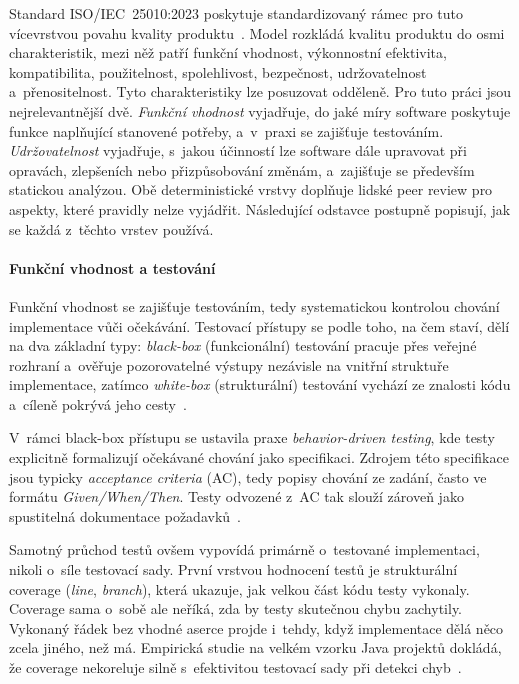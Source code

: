Standard ISO/IEC~25010:2023 poskytuje standardizovaný rámec
pro tuto vícevrstvou povahu kvality produktu~\cite{iso25010}. Model
rozkládá kvalitu produktu do osmi charakteristik, mezi něž patří funkční vhodnost,
výkonnostní efektivita,
kompatibilita, použitelnost, spolehlivost, bezpečnost, udržovatelnost
a~přenositelnost. Tyto charakteristiky lze posuzovat odděleně. Pro tuto
práci jsou nejrelevantnější dvě. \textit{Funkční vhodnost} vyjadřuje, do jaké
míry software poskytuje funkce naplňující stanovené potřeby,
a~v~praxi se zajišťuje testováním. \textit{Udržovatelnost} vyjadřuje,
s~jakou účinností lze software dále upravovat při opravách,
zlepšeních nebo přizpůsobování změnám, a~zajišťuje se především
statickou analýzou. Obě deterministické vrstvy doplňuje lidské peer
review pro aspekty, které pravidly nelze vyjádřit. Následující
odstavce postupně popisují, jak se každá z~těchto vrstev používá.

\paragraph{Funkční vhodnost a testování}
Funkční vhodnost se zajišťuje testováním, tedy systematickou
kontrolou chování implementace vůči očekávání. Testovací přístupy se
podle toho, na čem staví, dělí na dva základní typy: \textit{black-box}
(funkcionální) testování pracuje přes veřejné rozhraní a~ověřuje
pozorovatelné výstupy nezávisle na vnitřní struktuře implementace,
zatímco \textit{white-box} (strukturální) testování vychází ze
znalosti kódu a~cíleně pokrývá jeho cesty~\cite{ammann2016}.

V~rámci black-box přístupu se ustavila praxe \textit{behavior-driven
testing}, kde testy explicitně formalizují očekávané chování jako
specifikaci. Zdrojem této specifikace jsou typicky \textit{acceptance
criteria} (AC), tedy popisy chování ze zadání, často ve formátu
\textit{Given/When/Then}. Testy odvozené z~AC tak slouží zároveň jako
spustitelná dokumentace požadavků~\cite{solis2011}.

Samotný průchod testů ovšem vypovídá primárně o~testované
implementaci, nikoli o~síle testovací sady. První vrstvou hodnocení
testů je strukturální coverage (\textit{line}, \textit{branch}),
která ukazuje, jak velkou část kódu testy vykonaly. Coverage sama
o~sobě ale neříká, zda by testy skutečnou chybu zachytily. Vykonaný
řádek bez vhodné aserce projde i~tehdy, když implementace dělá něco
zcela jiného, než má. Empirická studie na velkém vzorku Java projektů
dokládá, že coverage nekoreluje silně s~efektivitou testovací sady při
detekci chyb~\cite{inozemtseva2014}.

